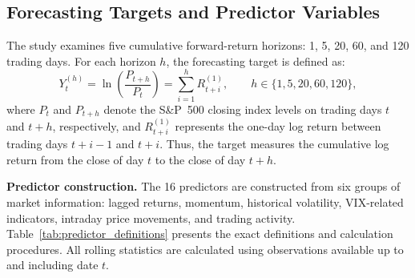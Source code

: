 \documentclass[runningheads,orivec]{llncs}
\begin{document}
\subsection{Forecasting Targets and Predictor Variables}\label{subsec:targets_predictors}

The study examines five cumulative forward-return horizons: 1, 5, 20, 60, and 120 trading days. For each horizon $h$, the forecasting target is defined as:
\begin{equation}\label{eq:target_return}
Y_t^{(h)} = \ln\left(\frac{P_{t+h}}{P_t}\right) = \sum_{i=1}^h R_{t+i}^{(1)}, \qquad h \in \{1, 5, 20, 60, 120\},
\end{equation}
where $P_t$ and $P_{t+h}$ denote the S\&P~500 closing index levels on trading days $t$ and $t+h$, respectively, and $R_{t+i}^{(1)}$ represents the one-day log return between trading days $t+i-1$ and $t+i$. Thus, the target measures the cumulative log return from the close of day $t$ to the close of day $t+h$.

\noindent\textbf{Predictor construction.} The 16 predictors are constructed from six groups of market information: lagged returns, momentum, historical volatility, VIX-related indicators, intraday price movements, and trading activity. Table~\ref{tab:predictor_definitions} presents the exact definitions and calculation procedures. All rolling statistics are calculated using observations available up to and including date $t$.
\end{document}
